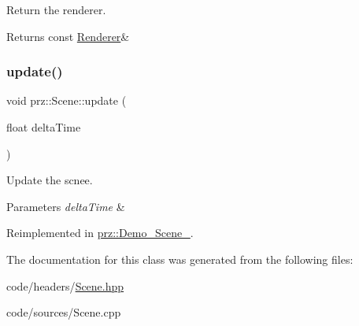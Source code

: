 Return the renderer. 

\begin{DoxyReturn}{Returns}
const \mbox{\hyperlink{classprz_1_1_renderer}{Renderer}}\& 
\end{DoxyReturn}
\mbox{\label{classprz_1_1_scene_a19ade334f3e3ecf0cf0ace488963ef00}} 
\subsubsection{\texorpdfstring{update()}{update()}}
{\footnotesize\ttfamily void prz\+::\+Scene\+::update (\begin{DoxyParamCaption}\item[{float}]{delta\+Time }\end{DoxyParamCaption})\hspace{0.3cm}{\ttfamily [virtual]}}



Update the scnee. 


\begin{DoxyParams}{Parameters}
{\em delta\+Time} & \\
\hline
\end{DoxyParams}


Reimplemented in \mbox{\hyperlink{classprz_1_1_demo___scene__01_ad452238849b24043acb89b1d76f996cb}{prz\+::\+Demo\+\_\+\+Scene\+\_}}.



The documentation for this class was generated from the following files\+:\begin{DoxyCompactItemize}
\item 
code/headers/\mbox{\hyperlink{_scene_8hpp}{Scene.\+hpp}}\item 
code/sources/Scene.\+cpp\end{DoxyCompactItemize}
